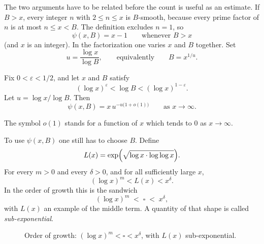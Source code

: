 The two arguments have to be related before the count is useful as an
estimate. If $B>x$, every integer $n$ with $2\le n\le x$ is $B$-smooth,
because every prime factor of $n$ is at most $n\le x<B$. The definition
excludes $n=1$, so
\[
    \psi(x,B)=x-1
    \qquad\text{whenever }B>x
\]
(and $x$ is an integer). In the factorization one varies $x$ and $B$
together. Set
\[
    u=\frac{\log x}{\log B},
    \qquad\text{equivalently}\qquad
    B=x^{1/u}.
\]


\begin{keybox}
\begin{theorem}
Fix $0<\varepsilon<1/2$, and let $x$ and $B$ satisfy
\[
    (\log x)^{\varepsilon}
    <
    \log B
    <
    (\log x)^{1-\varepsilon}.
\]
Let $u=\log x/\log B$. Then
\[
    \psi(x,B)
    =
    x\,u^{-u\bigl(1+o(1)\bigr)}
    \qquad\text{as }x\to\infty.
\]
\end{theorem}
\end{keybox}

\begin{remark}
The symbol $o(1)$ stands for a function of $x$ which tends to $0$ as
$x\to\infty$.
\end{remark}

To use $\psi(x,B)$ one still has to choose $B$. Define
\[
    L(x)
    =
    \exp\Bigl(\sqrt{\log x\cdot\log\log x}\Bigr).
\]
For every $m>0$ and every $\delta>0$, and for all sufficiently large $x$,
\[
    (\log x)^{m}<L(x)<x^{\delta}.
\]
In the order of growth this is the sandwich
\[
    (\log x)^{m}
    \;<\;
    \square
    \;<\;
    x^{\delta},
\]
with $L(x)$ an example of the middle term. A quantity of that shape is
called \emph{sub-exponential}.

\begin{figure}[H]
\centering
{}
\caption{Order of growth: $(\log x)^{m}<\square<x^{\delta}$, with $L(x)$ sub-exponential.}
\end{figure}

